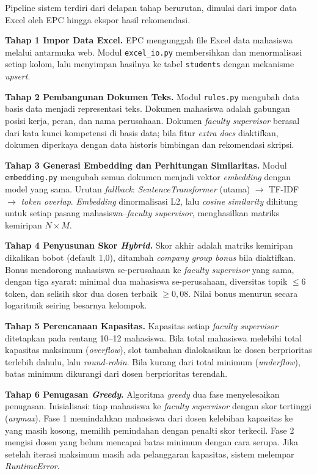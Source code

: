 Pipeline sistem terdiri dari delapan tahap berurutan, dimulai dari impor data Excel oleh EPC hingga ekspor hasil rekomendasi.

\textbf{Tahap 1 Impor Data Excel.} EPC mengunggah file Excel data mahasiswa melalui antarmuka web. Modul \texttt{excel\_io.py} membersihkan dan menormalisasi setiap kolom, lalu menyimpan hasilnya ke tabel \texttt{students} dengan mekanisme \textit{upsert}.

\textbf{Tahap 2 Pembangunan Dokumen Teks.} Modul \texttt{rules.py} mengubah data basis data menjadi representasi teks. Dokumen mahasiswa adalah gabungan posisi kerja, peran, dan nama perusahaan. Dokumen \textit{faculty supervisor} berasal dari kata kunci kompetensi di basis data; bila fitur \textit{extra docs} diaktifkan, dokumen diperkaya dengan data historis bimbingan dan rekomendasi skripsi.

\textbf{Tahap 3 Generasi Embedding dan Perhitungan Similaritas.} Modul \texttt{embedding.py} mengubah semua dokumen menjadi vektor \textit{embedding} dengan model yang sama. Urutan \textit{fallback}: \textit{SentenceTransformer} (utama) $\to$ TF-IDF $\to$ \textit{token overlap}. \textit{Embedding} dinormalisasi L2, lalu \textit{cosine similarity} dihitung untuk setiap pasang mahasiswa--\textit{faculty supervisor}, menghasilkan matriks kemiripan $N \times M$.

\textbf{Tahap 4 Penyusunan Skor \textit{Hybrid}.} Skor akhir adalah matriks kemiripan dikalikan bobot (default 1,0), ditambah \textit{company group bonus} bila diaktifkan. Bonus mendorong mahasiswa se-perusahaan ke \textit{faculty supervisor} yang sama, dengan tiga syarat: minimal dua mahasiswa se-perusahaan, diversitas topik $\leq 6$ token, dan selisih skor dua dosen terbaik $\geq 0{,}08$. Nilai bonus menurun secara logaritmik seiring besarnya kelompok.

\textbf{Tahap 5 Perencanaan Kapasitas.} Kapasitas setiap \textit{faculty supervisor} ditetapkan pada rentang 10--12 mahasiswa. Bila total mahasiswa melebihi total kapasitas maksimum (\textit{overflow}), slot tambahan dialokasikan ke dosen berprioritas terlebih dahulu, lalu \textit{round-robin}. Bila kurang dari total minimum (\textit{underflow}), batas minimum dikurangi dari dosen berprioritas terendah.

\textbf{Tahap 6 Penugasan \textit{Greedy}.} Algoritma \textit{greedy} dua fase menyelesaikan penugasan. Inisialisasi: tiap mahasiswa ke \textit{faculty supervisor} dengan skor tertinggi (\textit{argmax}). Fase 1 memindahkan mahasiswa dari dosen kelebihan kapasitas ke yang masih kosong, memilih pemindahan dengan penalti skor terkecil. Fase 2 mengisi dosen yang belum mencapai batas minimum dengan cara serupa. Jika setelah iterasi maksimum masih ada pelanggaran kapasitas, sistem melempar \textit{RuntimeError}.

